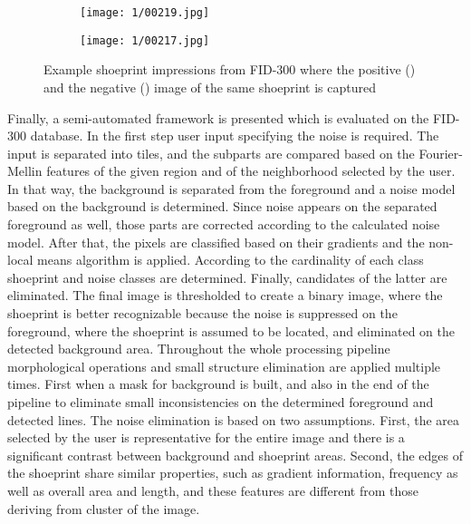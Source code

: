 \documentclass[draft,final]{vutinfth} %
\begin{document}
\begin{figure}[H]
  \centering
  \begin{subfigure}[t]{0.38\columnwidth}
    \centering
    \texttt{[image: 1/00219.jpg]}
	\caption{}
	\label{fig:int:cap:pos}
  \end{subfigure}
  \begin{subfigure}[t]{0.38\columnwidth}
    \centering
    \texttt{[image: 1/00217.jpg]}
	\caption{}
	\label{fig:int:cap:neg}
  \end{subfigure}
  \caption{Example shoeprint impressions from FID-300 where the positive () and the negative () image of the same shoeprint is captured}
  \label{fig:int:cap}
\end{figure}

\par
Finally, a semi-automated framework is presented which is evaluated on the FID-300 database.
In the first step user input specifying the noise is required.
The input is separated into tiles, and the subparts are compared based on the Fourier-Mellin features of the given region and of the neighborhood selected by the user.
In that way, the background is separated from the foreground and a noise model based on the background is determined.
Since noise appears on the separated foreground as well, those parts are corrected according to the calculated noise model.
After that, the pixels are classified based on their gradients and the non-local means algorithm is applied.
According to the cardinality of each class shoeprint and noise classes are determined.
Finally, candidates of the latter are eliminated.
The final image is thresholded to create a binary image, where the shoeprint is better recognizable because the noise is suppressed on the foreground, where the shoeprint is assumed to be located, and eliminated on the detected background area.
Throughout the whole processing pipeline morphological operations and small structure elimination are applied multiple times. 
First when a mask for background is built, and also in the end of the pipeline to eliminate small inconsistencies on the determined foreground and detected lines. 
The noise elimination is based on two assumptions.
First, the area selected by the user is representative for the entire image and there is a significant contrast between background and shoeprint areas.
Second, the edges of the shoeprint share similar properties, such as gradient information, frequency as well as overall area and length, and these features are different from those deriving from cluster of the image.
\end{document}
